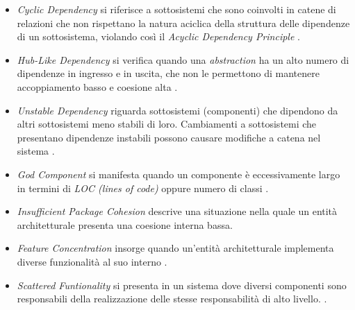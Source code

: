         \begin{itemize}
            \item \textit{Cyclic Dependency} si riferisce a sottosistemi che sono coinvolti in catene di relazioni che non rispettano la natura aciclica della struttura delle dipendenze di un sottosistema, violando così il \textit{Acyclic Dependency Principle} \cite{martin2000design} \cite{Arcan2017}. %
            
            \item \textit{Hub-Like Dependency} si verifica quando una \textit{abstraction} ha un alto numero di dipendenze in ingresso e in uscita, che non le permettono di mantenere accoppiamento basso e coesione alta \cite{Arcan2017}.
            
            \item \textit{Unstable Dependency} riguarda sottosistemi (componenti) che dipendono da altri sottosistemi meno stabili di loro. Cambiamenti a sottosistemi che presentano dipendenze instabili possono causare modifiche a catena nel sistema \cite{Arcan2017}.
            
            \item \textit{God Component} si manifesta quando un componente è eccessivamente largo in termini di \textit{LOC (lines of code)} oppure numero di classi \cite{lippert2006refactoring}. 
            
            \item \textit{Insufficient Package Cohesion} descrive una situazione nella quale un entità architetturale presenta una coesione interna bassa.
            
            \item \textit{Feature Concentration} insorge quando un'entità architetturale implementa diverse funzionalità al suo interno \cite{deAndrade2014}.
            
            \item \textit{Scattered Funtionality} si presenta in un sistema dove diversi componenti sono responsabili della realizzazione delle stesse responsabilità di alto livello. \cite{Garcia2009}.
        \end{itemize}
        
